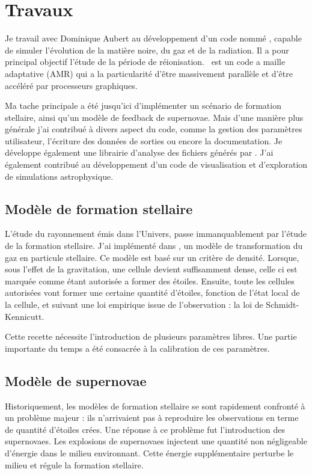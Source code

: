 \section*{Travaux}

Je travail avec Dominique Aubert au développement d'un code nommé \emma, capable de simuler l'évolution de la matière noire, du gaz et de la radiation.
Il a pour principal objectif l'étude de la période de réionisation.
\emma\ est un code a maille adaptative (AMR) qui a la particularité d'être massivement parallèle et d'être accéléré par processeurs graphiques.

Ma tache principale a été jusqu'ici d'implémenter un scénario de formation stellaire, ainsi qu'un modèle de feedback de supernovae.
Mais d'une manière plus générale j'ai contribué à divers aspect du code, comme la gestion des paramètres utilisateur, l'écriture des données de sorties ou encore la documentation.
Je développe également une librairie d'analyse des fichiers générés par \emma.
J'ai également contribué au développement d'un code de visualisation et d'exploration de simulations astrophysique.

\subsection*{Mod\`ele de formation stellaire}
L'étude du rayonnement émis dans l'Univers, passe immanquablement par l'étude de la formation stellaire.
J'ai implémenté dans \emma, un modèle de transformation du gaz en particule stellaire.
Ce modèle est basé sur un critère de densité.
Lorsque, sous l'effet de la gravitation, une cellule devient suffisamment dense, celle ci est marquée comme étant autorisée a former des étoiles.
Ensuite, toute les cellules autorisées vont former une certaine quantité d'étoiles, fonction de l'état local de la cellule, et suivant une loi empirique issue de l'observation : la loi de Schmidt-Kennicutt.

Cette recette nécessite l'introduction de plusieurs paramètres libres.
Une partie importante du temps a été consacrée à la calibration de ces paramètres.

\subsection*{Mod\`ele de supernovae}

Historiquement, les modèles de formation stellaire se sont rapidement confronté à un problème majeur : ils n'arrivaient pas à reproduire les observations en terme de quantité d'étoiles crées.
Une réponse à ce problème fut l'introduction des supernovaes. 
Les explosions de supernovaes injectent une quantité non négligeable d'énergie dans le milieu environnant.
Cette énergie supplémentaire perturbe le milieu et régule la formation stellaire.

